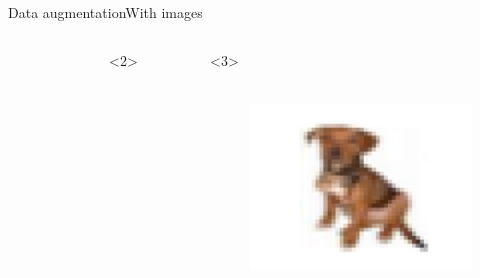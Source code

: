 \documentclass[10pt,aspectratio=43]{beamer}
\begin{document}
\begin{frame}{Data augmentation}{With images}
\begin{onlyenv}
\begin{columns}[t]
\begin{figure}
        \end{figure}
        \column{.5\paperwidth}
        \centering
        \begin{onlyenv}<2>
            \begin{figure}
            \end{figure}
        \end{onlyenv}
        \begin{onlyenv}<3>
            \begin{figure}
                \vspace{-1.2cm}
            \hbox{\hspace{-3em}
            \includegraphics[scale=.4, angle=30, origin]{dog_cifar.pdf}}
            \end{figure}
        \end{onlyenv}
    \end{columns}
    \end{onlyenv}
\end{frame}
\end{document}
